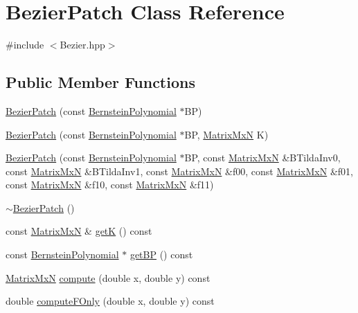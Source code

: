 \hypertarget{class_bezier_patch}{\section{Bezier\-Patch Class Reference}
\label{class_bezier_patch}
}


{\ttfamily \#include $<$Bezier.\-hpp$>$}

\subsection*{Public Member Functions}
\begin{DoxyCompactItemize}
\item 
\hyperlink{class_bezier_patch_a50506bb4f40a7a537637a114a77d844e}{Bezier\-Patch} (const \hyperlink{class_bernstein_polynomial}{Bernstein\-Polynomial} $\ast$B\-P)
\item 
\hyperlink{class_bezier_patch_ae562d080e4f57c1aef0a8f19adcc4133}{Bezier\-Patch} (const \hyperlink{class_bernstein_polynomial}{Bernstein\-Polynomial} $\ast$B\-P, \hyperlink{class_matrix_mx_n}{Matrix\-Mx\-N} K)
\item 
\hyperlink{class_bezier_patch_ab5b226280fc0afba7e6f21b72423dc8c}{Bezier\-Patch} (const \hyperlink{class_bernstein_polynomial}{Bernstein\-Polynomial} $\ast$B\-P, const \hyperlink{class_matrix_mx_n}{Matrix\-Mx\-N} \&B\-Tilda\-Inv0, const \hyperlink{class_matrix_mx_n}{Matrix\-Mx\-N} \&B\-Tilda\-Inv1, const \hyperlink{class_matrix_mx_n}{Matrix\-Mx\-N} \&f00, const \hyperlink{class_matrix_mx_n}{Matrix\-Mx\-N} \&f01, const \hyperlink{class_matrix_mx_n}{Matrix\-Mx\-N} \&f10, const \hyperlink{class_matrix_mx_n}{Matrix\-Mx\-N} \&f11)
\item 
\hyperlink{class_bezier_patch_aefc712578c4818d622d8a9f623786746}{$\sim$\-Bezier\-Patch} ()
\item 
const \hyperlink{class_matrix_mx_n}{Matrix\-Mx\-N} \& \hyperlink{class_bezier_patch_a32759c1605c0bd966ce87b6cf65bdd8f}{get\-K} () const 
\item 
const \hyperlink{class_bernstein_polynomial}{Bernstein\-Polynomial} $\ast$ \hyperlink{class_bezier_patch_ab5ae6752b90f10228c98948d1184a1bb}{get\-B\-P} () const 
\item 
\hyperlink{class_matrix_mx_n}{Matrix\-Mx\-N} \hyperlink{class_bezier_patch_a850bc5e09dfc474180f4bda49ddb6141}{compute} (double x, double y) const 
\item 
double \hyperlink{class_bezier_patch_af70a22fab5c247edfa5b5b2a762dac4c}{compute\-F\-Only} (double x, double y) const 
\end{DoxyCompactItemize}


